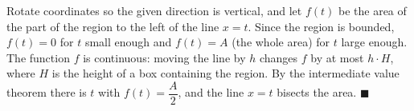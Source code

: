 Rotate coordinates so the given direction is vertical, and let $f(t)$ be the area of the part of the region to the left of the line $x=t$. Since the region is bounded, $f(t)=0$ for $t$ small enough and $f(t)=A$ (the whole area) for $t$ large enough. The function $f$ is continuous: moving the line by $h$ changes $f$ by at most $h\cdot H$, where $H$ is the height of a box containing the region. By the intermediate value theorem there is $t$ with $f(t)=\dfrac {A}{2}$, and the line $x=t$ bisects the area. $\blacksquare$
